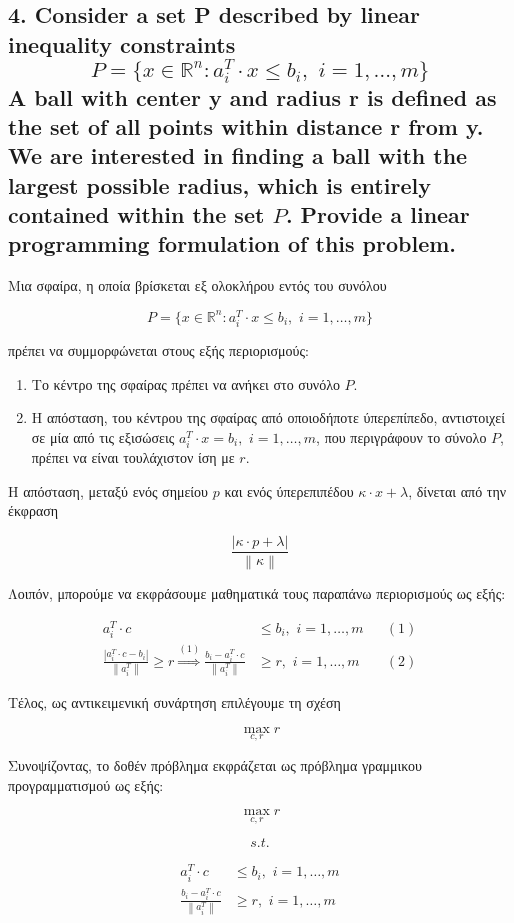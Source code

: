 \documentclass[12pt]{article}
\newcommand{\R}{\mathbb{R}}
\newcommand{\margin}{\hspace{4pt}}
\newcommand{\norm}[1]{\left\lVert#1\right\rVert}
\newcommand{\abs}[1]{\left\lvert#1\right\rvert}
\begin{document}
\vspace{2in}

\pagebreak

\subsection*{4. Consider a set P described by linear inequality constraints
\[ P = \{x \in \R^n : a^{T}_{i} \cdot x \leq b_i, \margin i = 1, \dotsc, m\} \]
A ball with center y and radius r is defined as the set of all points within distance r from y.
We are interested in finding a ball with the largest possible radius, which is entirely contained
within the set \( P \). Provide a linear programming formulation of this problem.}

Μια σφαίρα, η οποία βρίσκεται εξ ολοκλήρου εντός του συνόλου

\[ P = \{x \in \R^n : a^{T}_{i} \cdot x \leq b_i, \margin i = 1, \dotsc, m\} \]

πρέπει να συμμορφώνεται στους εξής περιορισμούς:

\begin{enumerate}
    \item Το κέντρο της σφαίρας πρέπει να ανήκει στο συνόλο \( P \).
    \item Η απόσταση, του κέντρου της σφαίρας από οποιοδήποτε ύπερεπίπεδο, αντιστοιχεί σε μία
    από τις εξισώσεις \( a^{T}_{i} \cdot x = b_i, \margin i = 1, \dotsc, m\),
    που περιγράφουν το σύνολο \( P \), πρέπει να είναι τουλάχιστον ίση με \( r \).
\end{enumerate}

Η απόσταση, μεταξύ ενός σημείου \( p \) και ενός ύπερεπιπέδου \( κ \cdot x + λ \),
δίνεται από την έκφραση

\[ \frac{\abs{κ \cdot p + λ}}{\norm{κ}} \]

Λοιπόν, μπορούμε να εκφράσουμε μαθηματικά τους παραπάνω περιορισμούς ως εξής:

\begin{align*}
    a^{T}_{i} \cdot c & \leq b_i, \margin i = 1, \dotsc, m && (1)\\
    \frac{\abs{a^{T}_{i} \cdot c - b_i}}{\norm{a^{T}_{i}}} \geq r
    \stackrel{(1)}{\Rightarrow}\frac{b_i - a^{T}_{i} \cdot c}{\norm{a^{T}_{i}}} & \geq r, \margin i = 1, \dotsc, m&& (2)
\end{align*}

Τέλος, ως αντικειμενική συνάρτηση επιλέγουμε τη σχέση

\[ \max_{c, r} r \]

Συνοψίζοντας, το δοθέν πρόβλημα εκφράζεται ως πρόβλημα γραμμικου προγραμματισμού ως εξής:

\[ \max_{c, r} r \]

\[ s.t. \]

\begin{align*}
    a^{T}_{i} \cdot c & \leq b_i, \margin i = 1, \dotsc, m \\
    \frac{b_i - a^{T}_{i} \cdot c}{\norm{a^{T}_{i}}} & \geq r, \margin i = 1, \dotsc, m
\end{align*}

\pagebreak
\end{document}
